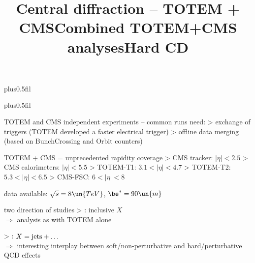 \newpage %
\hbox{}
\vfil
\title{Central diffraction -- TOTEM + CMS}

\vskip0pt plus0.5fil

\vskip0pt plus0.5fil


\newpage %
\title{Combined TOTEM+CMS analyses}

\> TOTEM and CMS independent experiments -- common runs need:
\>> exchange of triggers (TOTEM developed a faster electrical trigger)
\>> offline data merging (based on BunchCrossing and Orbit counters)

\> TOTEM + CMS = unprecedented rapidity coverage
\>> CMS tracker: $|η| < 2.5$
\>> CMS calorimeters: $|η| < 5.5$
\>> TOTEM-T1: $3.1 < |η| < 4.7$
\>> TOTEM-T2: $5.3 < |η| < 6.5$
\>> CMS-FSC: $6 < |η| < 8$

\> data available: $\sqrt s = 8\un{TeV}$, $\be^* = 90\un{m}$

\> two direction of studies
\>> : inclusive $X$\\
$\Rightarrow$ analysis as with TOTEM alone

\>> : $X = \hbox{jets} + \ldots$\\
$\Rightarrow$ interesting interplay between soft/non-perturbative and hard/perturbative QCD effects


\newpage %
\title{Hard CD}

\vskip-3mm


